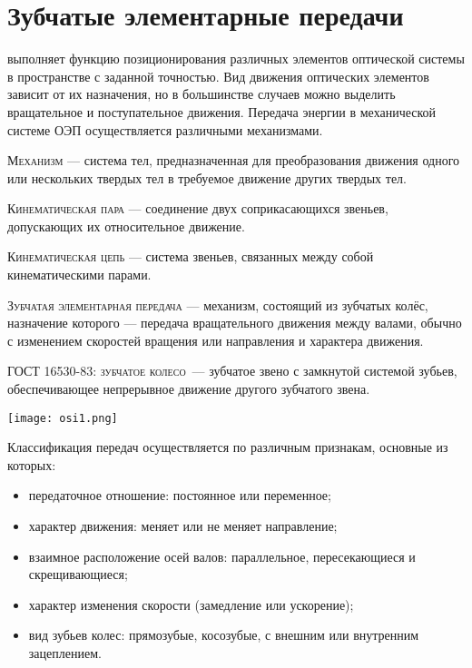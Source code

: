 
\chapter{Зубчатые элементарные передачи}
\label{ch:gears}

 выполняет функцию позиционирования различных элементов оптической системы в пространстве с заданной точностью.
Вид движения оптических элементов зависит от их назначения, но в большинстве случаев можно выделить вращательное и поступательное движения.
Передача энергии в механической системе ОЭП осуществляется различными механизмами.

\noindent
\textsc{Механизм} --- система тел, предназначенная для преобразования движения одного или нескольких твердых тел в требуемое движение других твердых тел.

\noindent
\textsc{Кинематическая пара} --- соединение двух соприкасающихся звеньев, допускающих их относительное движение.

\noindent
\textsc{Кинематическая цепь} --- система звеньев, связанных между собой кинематическими парами.

\noindent
\textsc{Зубчатая элементарная передача} --- механизм, состоящий из зубчатых колёс, назначение которого --- передача вращательного движения между валами, обычно с изменением скоростей вращения или направления и характера движения.

\noindent
ГОСТ 16530-83: \textsc{зубчатое колесо}~--- зубчатое звено с замкнутой системой зубьев, обеспечивающее непрерывное движение другого зубчатого звена.

\begin{marginfigure}
	\texttt{[image: osi1.png]}
\end{marginfigure}

Классификация передач осуществляется по различным признакам, основные из которых:
\begin{itemize}
	\item передаточное отношение: постоянное или переменное;
	\item характер движения: меняет или не меняет направление;
	\item взаимное расположение осей валов: параллельное, пересекающиеся и скрещивающиеся;
	\item характер изменения скорости (замедление или ускорение);
	\item вид зубьев колес: прямозубые, косозубые, с внешним или внутренним зацеплением.
\end{itemize}

